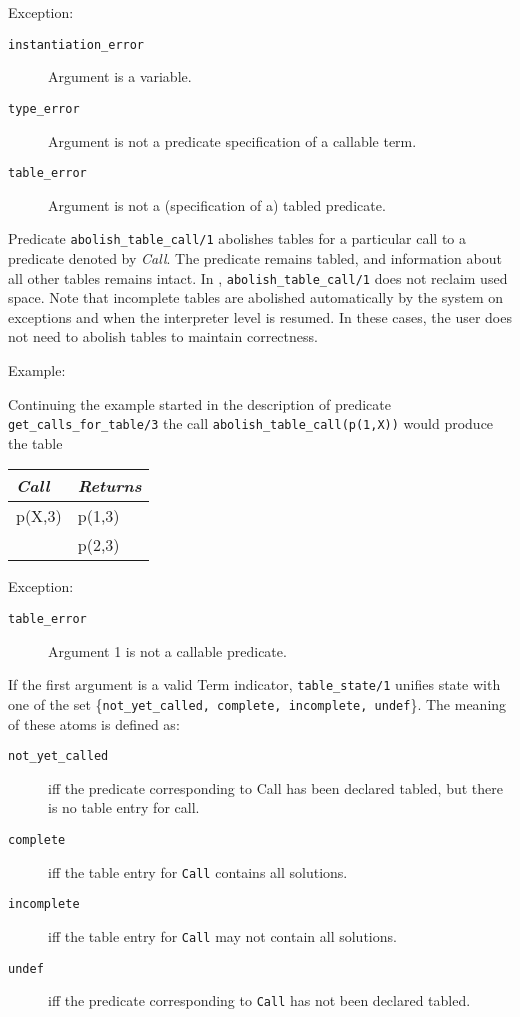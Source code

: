 \begin{description}
Exception:
    \begin{description}
    \item[{\tt instantiation\_error}]
	Argument is a variable.
    \item[{\tt type\_error}]
	Argument is not a predicate specification of a callable term.
    \item[{\tt table\_error}]
        Argument is not a (specification of a) tabled predicate.
    \end{description}


%
Predicate {\tt abolish\_table\_call/1} abolishes tables for a
particular call to a predicate denoted by {\em Call}.  The predicate
remains tabled, and information about all other tables remains intact.
In \version, {\tt abolish\_table\_call/1} does not reclaim used space.
Note that incomplete tables are abolished automatically by the system
on exceptions and when the interpreter level is resumed.  In these
cases, the user does not need to abolish tables to maintain
correctness.

Example:

    Continuing the example started in the description of predicate
    {\tt get\_calls\_for\_table/3} the call
    {\tt abolish\_table\_call(p(1,X))} would produce the table
    \begin{center}
    \begin{tabular}{||l|l||}               \hline
    {\em Call}			& {\em Returns} \\ \hline \hline
    p(X,3)			& p(1,3) \\ 
	       			& p(2,3) \\ \hline
    \end{tabular}
    \end{center}

Exception:
    \begin{description}
    \item[{\tt table\_error}]
	Argument 1 is not a callable predicate.
    \end{description}


If the first argument is a valid Term indicator, {\tt table\_state/1}
unifies state with one of the set 
	\{{\tt not\_yet\_called, complete, incomplete, undef}\}.
The meaning of these atoms is defined as:
\begin{description}
\item[{\tt not\_yet\_called}] iff the predicate corresponding to
Call has been declared tabled, but there is no table entry for call.
\item[{\tt complete}] iff the table entry for {\tt Call} contains
all solutions.
\item[{\tt incomplete}] iff the table entry for {\tt Call} may not contain
all solutions.
\item[{\tt undef}] iff the predicate corresponding to {\tt Call} 
has not been declared tabled.
\end{description}


\end{description}
